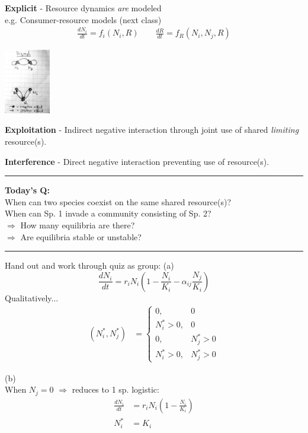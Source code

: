 \documentclass{article}
\newcommand{\note}[1]{\colorbox{gray!30}{#1}}
\newcommand{\ind}{\-\hspace{1cm}}
\begin{document}
\textbf{Explicit} - Resource dynamics \emph{are} modeled\\
\ind \ind e.g. Consumer-resource models (\note{next class})
\begin{align*}
	\frac{dN_i}{dt}=f_i(N_i,R) \quad \quad 
	\frac{dR}{dt}=f_R(N_i,N_j,R)
\end{align*}
\begin{center}
\includegraphics[width=2cm]{figs/Digraph_explicit.pdf}
\end{center}

\textbf{Exploitation} - Indirect negative interaction through joint use of shared \emph{limiting} resource(s).

\textbf{Interference} - Direct negative interaction preventing use of resource(s).

\rule[0.5ex]{\linewidth}{1pt}

\textbf{Today's Q:} \\ 
\ind When can two species coexist on the same shared resource(s)?\\
\ind When can Sp. 1 invade a community consisting of Sp. 2?\\
\ind \ind $\Rightarrow$ How many equilibria are there?\\
\ind \ind $\Rightarrow$ Are equilibria stable or unstable?\\

\rule[0.5ex]{\linewidth}{1pt}
\pagebreak

\note{Hand out and work through quiz as group:}
(a)
\begin{equation*}
		\frac{dN_i}{dt}=r_i N_i \left (1-\frac{N_i}{K_i} - \alpha_{ij}\frac{N_j}{K_i}\right)
\end{equation*}
Qualitatively...
\begin{align*}
(N_i^*,N_j^*)& =
\begin{cases}
	0, & 0  \\
	N_i^* > 0, & 0  \\
	0, & N_j^* > 0\\
	N_i^* > 0, & N_j^* > 0
\end{cases}
\end{align*}

(b)\\
When $N_j=0$ $\Rightarrow$ reduces to 1 sp. logistic:
\begin{align*}
	\frac{dN_i}{dt} & =r_i N_i \left (1-\frac{N_i}{K_i} \right)\\
	N_i^*  & = K_i
\end{align*}
\end{document}
